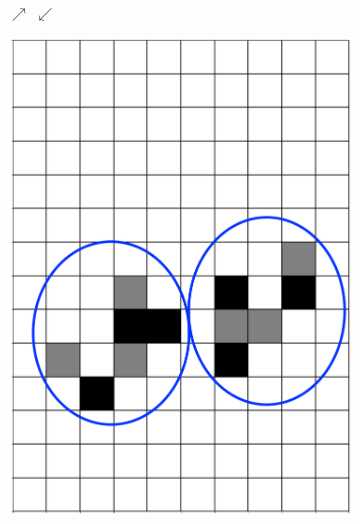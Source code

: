 \documentclass[12pt]{article}
\numberwithin{figure}{section} %
\begin{document}
\begin{figure}[H]
	\begin{subfigure}[t]{0.06\textwidth}
	\centering
		{\LARGE$\nearrow{}$}
		{\LARGE$\swarrow{}$}
  	\end{subfigure}	
	\begin{subfigure}{0.22\textwidth}
     		\centering
     		\includegraphics[width=\linewidth]{Section4/37.0}
     		\subcaption{}
   	\end{subfigure}
    	\begin{subfigure}{0.22\textwidth}
     		\centering

\end{subfigure}
\end{figure}
\end{document}

